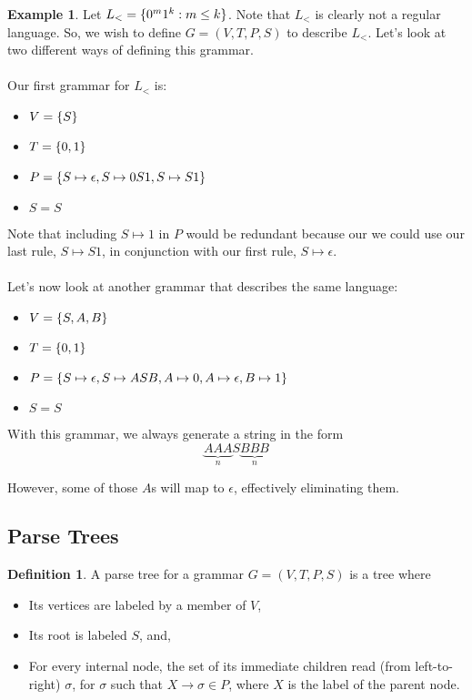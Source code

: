 \documentclass[]{article}
\DeclarePairedDelimiter{\set}{\lbrace}{\rbrace}
\theoremstyle{definition}
\newtheorem*{defn}{Definition}
\newtheorem{ex}{Example}[section]
\begin{document}
        \begin{ex}
          Let $L_< = \set{0^m 1^k : m \le k}$. Note that $L_<$ is clearly not a regular language. So, we wish to define $G = (V, T, P, S)$ to describe $L_<$. Let's look at two different ways of defining this grammar.
          \\ \\
          Our first grammar for $L_<$ is:
          \begin{itemize}
            \item $V = \set{S}$
            \item $T = \set{0, 1}$
            \item $P = \set{ S \mapsto \epsilon, S \mapsto 0S1, S \mapsto S1}$
            \item $S = S$
          \end{itemize}

          Note that including $S \mapsto 1$ in $P$ would be redundant because our we could use our last rule, $S \mapsto S1$, in conjunction with our first rule, $S \mapsto \epsilon$.
          \\ \\
          Let's now look at another grammar that describes the same language:
          \begin{itemize}
            \item $V = \set{S, A, B}$
            \item $T = \set{0, 1}$
            \item $P = \set{S \mapsto \epsilon, S \mapsto ASB, A \mapsto 0, A \mapsto \epsilon, B \mapsto 1}$
            \item $S = S$
          \end{itemize}

          With this grammar, we always generate a string in the form
          $$
            \underbrace{AAA}_{n} S \underbrace{BBB}_{n}
          $$

          However, some of those $A$s will map to $\epsilon$, effectively eliminating them.
        \end{ex}

    \subsection{Parse Trees}
      \begin{defn}
        A parse tree for a grammar $G = (V, T, P, S)$ is a tree where
        \begin{itemize}
          \item Its vertices are labeled by a member of $V$,
          \item Its root is labeled $S$, and,
          \item For every internal node, the set of its immediate children read (from left-to-right) $\sigma$, for $\sigma$ such that $X \to \sigma \in P$, where $X$ is the label of the parent node.
        \end{itemize}
      \end{defn}
\end{document}
